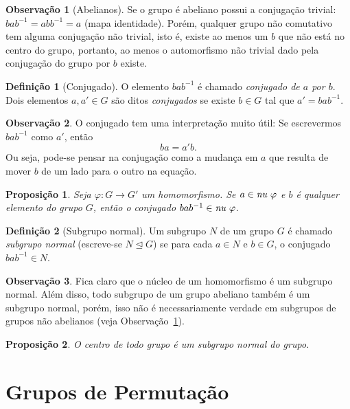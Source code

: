 \documentclass[a4paper,12pt]{report}
\newcommand{\nucleoe}{\emph{\text{nu }}}
\theoremstyle{plain}
\newtheorem{proposicao}{Proposição}[section]
\theoremstyle{definition}
\newtheorem{definicao}{Definição}[section]
\newtheorem{observacao}{Observação}[section]
\begin{document}
\begin{observacao}[Abelianos]\label{ob:conjugadosDeAbelianos}
	Se o grupo é abeliano possui a conjugação trivial:
	\(bab^{ -1} = abb^{-1} = a\) (mapa identidade). Porém, qualquer grupo não comutativo tem alguma conjugação não trivial, isto é, existe ao menos um $b$ que não está no centro do grupo, portanto, ao menos o automorfismo não trivial dado pela conjugação do grupo por $b$ existe. 
\end{observacao}

\begin{definicao}[Conjugado]
	O elemento \(bab^{-1}\) é chamado \emph{conjugado de \(a\) por \(b\)}. Dois elementos \(a, a'\in G\) são ditos \emph{conjugados} se existe \(b\in G\) tal que \(a' = bab^{-1}\).	
\end{definicao}

\begin{observacao}
	O conjugado tem uma interpretação muito útil: Se escrevermos
	\(bab^{-1}\) como \(a'\), então \[ba = a'b.\] Ou seja, pode-se pensar na
	conjugação como a mudança em \(a\) que resulta de mover \(b\) de um lado
	para o outro na equação.
\end{observacao}		


\begin{proposicao}
	Seja $\varphi: G \longrightarrow G'$ um homomorfismo. Se \(a\in \nucleoe\varphi\) e \(b\) é qualquer elemento do grupo \(G\), então o conjugado \(bab^{-1} \in \nucleoe\varphi\).
\end{proposicao}

\begin{definicao}[Subgrupo normal]
	Um subgrupo \(N\) de um grupo \(G\) é chamado \emph{subgrupo normal} (escreve-se $N\trianglelefteq G$) se para cada \(a\in N\) e \(b\in G\), o conjugado
	\(bab^{-1} \in N\).
\end{definicao}

\begin{observacao}
	Fica claro que o núcleo de um homomorfismo é um subgrupo normal. Além disso, todo subgrupo de um grupo abeliano também é um subgrupo normal, porém, isso não é
	necessariamente verdade em subgrupos de grupos não abelianos (veja Observação~\ref{ob:conjugadosDeAbelianos}). 
\end{observacao}

\begin{proposicao}
	O centro de todo grupo é um subgrupo normal do grupo.
\end{proposicao}

\section{Grupos de Permutação}
\end{document}
